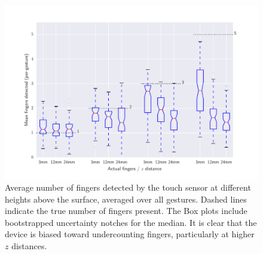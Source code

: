 \documentclass{l4proj}
\begin{document}
\begin{figure}
    \centering
    \includegraphics[width=1.0\linewidth]{images/boxplot_finger_distance.pdf}    

    \caption{Average number of fingers detected by the touch sensor at different heights above the surface, averaged over all gestures. Dashed lines indicate
    the true number of fingers present. The Box plots include bootstrapped uncertainty notches for the median. It is clear that the device is biased toward 
    undercounting fingers, particularly at higher $z$ distances.
    }

    \label{fig:boxplot} 
\end{figure}
\end{document}
